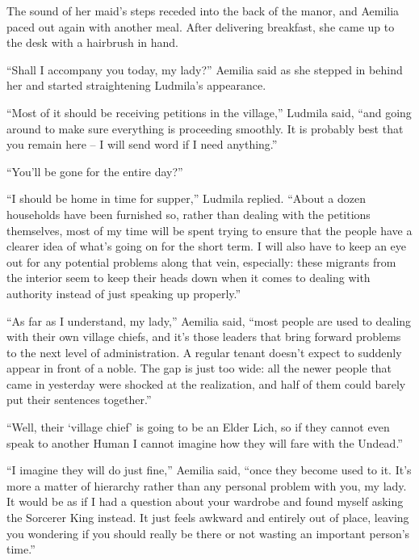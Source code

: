  

The sound of her maid’s steps receded into the back of the manor, and Aemilia paced out again with another meal. After delivering breakfast, she came up to the desk with a hairbrush in hand.

 

“Shall I accompany you today, my lady?” Aemilia said as she stepped in behind her and started straightening Ludmila’s appearance.

 

“Most of it should be receiving petitions in the village,” Ludmila said, “and going around to make sure everything is proceeding smoothly. It is probably best that you remain here – I will send word if I need anything.”

 

“You’ll be gone for the entire day?”

 

“I should be home in time for supper,” Ludmila replied. “About a dozen households have been furnished so, rather than dealing with the petitions themselves, most of my time will be spent trying to ensure that the people have a clearer idea of what’s going on for the short term. I will also have to keep an eye out for any potential problems along that vein, especially: these migrants from the interior seem to keep their heads down when it comes to dealing with authority instead of just speaking up properly.”

 

“As far as I understand, my lady,” Aemilia said, “most people are used to dealing with their own village chiefs, and it’s those leaders that bring forward problems to the next level of administration. A regular tenant doesn’t expect to suddenly appear in front of a noble. The gap is just too wide: all the newer people that came in yesterday were shocked at the realization, and half of them could barely put their sentences together.”

 

“Well, their ‘village chief’ is going to be an Elder Lich, so if they cannot even speak to another Human I cannot imagine how they will fare with the Undead.”

 

“I imagine they will do just fine,” Aemilia said, “once they become used to it. It’s more a matter of hierarchy rather than any personal problem with you, my lady. It would be as if I had a question about your wardrobe and found myself asking the Sorcerer King instead. It just feels awkward and entirely out of place, leaving you wondering if you should really be there or not wasting an important person’s time.”

